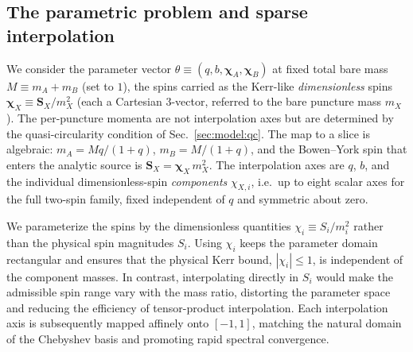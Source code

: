 \documentclass[
  aps,
  prd,
  twocolumn,
  amsmath,
  amssymb,
  nofootinbib,
  superscriptaddress,
  floatfix,
]{revtex4-2}
\begin{document}
\subsection{The parametric problem and sparse interpolation}
\label{sec:param:interp}

We consider the parameter vector $\theta \equiv (q, b, \boldsymbol{\chi}_A, \boldsymbol{\chi}_B)$ at fixed total
bare mass $M \equiv m_A + m_B$ (set to $1$), the spins carried as the Kerr-like
\emph{dimensionless} spins $\boldsymbol{\chi}_X \equiv \boldsymbol{S}_X/m_X^2$ (each a Cartesian 3-vector,
referred to the bare puncture mass $m_X$).
The per-puncture momenta are not interpolation axes but are determined by the
quasi-circularity condition of Sec.~\ref{sec:model:qc}.
The map to a slice is algebraic: $m_A = Mq/(1+q)$, $m_B = M/(1+q)$, and the
Bowen--York spin that enters the analytic source is $\boldsymbol{S}_X = \boldsymbol{\chi}_X\, m_X^2$. The
interpolation axes are $q$, $b$, and the individual dimensionless-spin
\emph{components} $\chi_{X,i}$, i.e.\ up to eight scalar axes for the full two-spin
family, fixed independent of
$q$ and symmetric about zero.

We parameterize the spins by the dimensionless quantities
$\chi_i \equiv S_i/m_i^2$ rather than the physical spin magnitudes $S_i$.
Using $\chi_i$ keeps the parameter domain rectangular and ensures that the
physical Kerr bound, $|\chi_i|\le1$, is independent of the component masses.
In contrast, interpolating directly in $S_i$ would make the admissible spin
range vary with the mass ratio, distorting the parameter space and reducing the
efficiency of tensor-product interpolation. Each interpolation axis is
subsequently mapped affinely onto $[-1,1]$, matching the natural domain of the
Chebyshev basis and promoting rapid spectral convergence.
\end{document}
